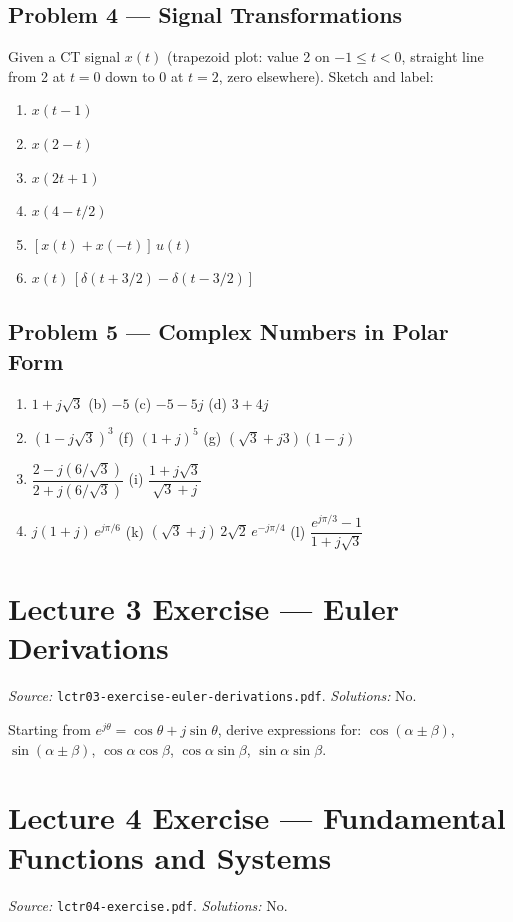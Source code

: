\documentclass[11pt]{article}
\begin{document}
\subsection{Problem 4 --- Signal Transformations}
Given a CT signal $x(t)$ (trapezoid plot: value 2 on $-1\le t<0$, straight line from 2 at $t=0$ down to 0 at $t=2$, zero elsewhere). Sketch and label:
\begin{enumerate}[label=(\alph*)]
  \item $x(t-1)$
  \item $x(2-t)$
  \item $x(2t+1)$
  \item $x(4 - t/2)$
  \item $[x(t) + x(-t)]\,u(t)$
  \item $x(t)\,[\delta(t+3/2) - \delta(t-3/2)]$
\end{enumerate}

\subsection{Problem 5 --- Complex Numbers in Polar Form}
\begin{enumerate}[label=(\alph*)]
  \item $1 + j\sqrt{3}$ \quad (b) $-5$ \quad (c) $-5 - 5j$ \quad (d) $3 + 4j$
  \item[(e)] $(1 - j\sqrt{3})^3$ \quad (f) $(1+j)^5$ \quad (g) $(\sqrt{3} + j3)(1-j)$
  \item[(h)] $\dfrac{2 - j(6/\sqrt{3})}{2 + j(6/\sqrt{3})}$ \quad (i) $\dfrac{1+j\sqrt{3}}{\sqrt{3}+j}$
  \item[(j)] $j(1+j)\,e^{j\pi/6}$ \quad (k) $(\sqrt{3}+j)\,2\sqrt{2}\,e^{-j\pi/4}$ \quad (l) $\dfrac{e^{j\pi/3}-1}{1+j\sqrt{3}}$
\end{enumerate}

\section{Lecture 3 Exercise --- Euler Derivations}
\emph{Source:} \texttt{lctr03-exercise-euler-derivations.pdf}. \emph{Solutions:} No.

Starting from $e^{j\theta} = \cos\theta + j\sin\theta$, derive expressions for:
$\cos(\alpha\pm\beta)$, $\sin(\alpha\pm\beta)$, $\cos\alpha\cos\beta$, $\cos\alpha\sin\beta$, $\sin\alpha\sin\beta$.

\section{Lecture 4 Exercise --- Fundamental Functions and Systems}
\emph{Source:} \texttt{lctr04-exercise.pdf}. \emph{Solutions:} No.
\end{document}
